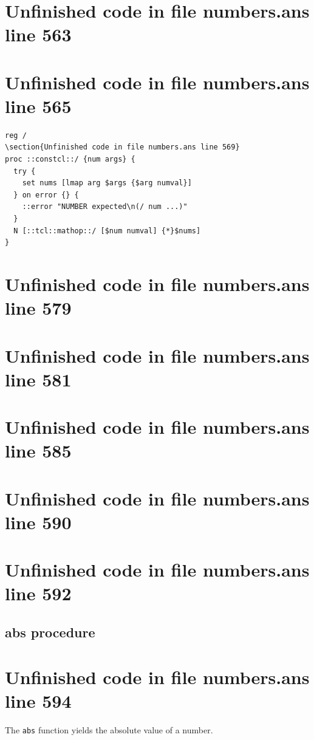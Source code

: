 \documentclass[twoside,9pt]{report}
\begin{document}
\section{Unfinished code in file numbers.ans line 563}
\section{Unfinished code in file numbers.ans line 565}
\index{/}
\begin{lstlisting}
reg /
\section{Unfinished code in file numbers.ans line 569}
proc ::constcl::/ {num args} {
  try {
    set nums [lmap arg $args {$arg numval}]
  } on error {} {
    ::error "NUMBER expected\n(/ num ...)"
  }
  N [::tcl::mathop::/ [$num numval] {*}$nums]
}
\end{lstlisting}
\section{Unfinished code in file numbers.ans line 579}
\section{Unfinished code in file numbers.ans line 581}
\section{Unfinished code in file numbers.ans line 585}
\section{Unfinished code in file numbers.ans line 590}
\section{Unfinished code in file numbers.ans line 592}
\subsection{abs procedure}
\label{abs-procedure}
\section{Unfinished code in file numbers.ans line 594}


The \texttt{abs} function yields the absolute value of a number.
\end{document}
